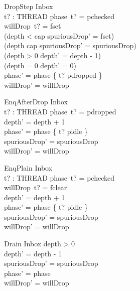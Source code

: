 \documentclass[a4paper,10pt,fleqn]{article}
\begin{document}
\begin{schema}{DropStep}
  \Delta Inbox \\
  t? : THREAD
\where
  phase~t? = pchecked \\
  willDrop~t? = fset \\
  (depth < cap \implies spuriousDrop' = fset) \\
  (depth \geq cap \implies spuriousDrop' = spuriousDrop) \\
  (depth > 0 \implies depth' = depth - 1) \\
  (depth = 0 \implies depth' = 0) \\
  phase' = phase \oplus \{ t? \mapsto pdropped \} \\
  willDrop' = willDrop
\end{schema}

\begin{schema}{EnqAfterDrop}
  \Delta Inbox \\
  t? : THREAD
\where
  phase~t? = pdropped \\
  depth' = depth + 1 \\
  phase' = phase \oplus \{ t? \mapsto pidle \} \\
  spuriousDrop' = spuriousDrop \\
  willDrop' = willDrop
\end{schema}

\begin{schema}{EnqPlain}
  \Delta Inbox \\
  t? : THREAD
\where
  phase~t? = pchecked \\
  willDrop~t? = fclear \\
  depth' = depth + 1 \\
  phase' = phase \oplus \{ t? \mapsto pidle \} \\
  spuriousDrop' = spuriousDrop \\
  willDrop' = willDrop
\end{schema}

\begin{schema}{Drain}
  \Delta Inbox
\where
  depth > 0 \\
  depth' = depth - 1 \\
  spuriousDrop' = spuriousDrop \\
  phase' = phase \\
  willDrop' = willDrop
\end{schema}
\end{document}
